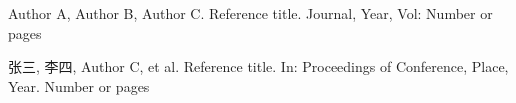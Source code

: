 \documentclass{SCIS2020cn}
\begin{document}
\begin{thebibliography}{99}

 Author A, Author B, Author C. Reference title. Journal, Year, Vol: Number or pages

 张三, 李四, Author C, et al. Reference title. In: Proceedings of Conference, Place, Year. Number or pages

\end{thebibliography}



\makeentitle









\end{document}
